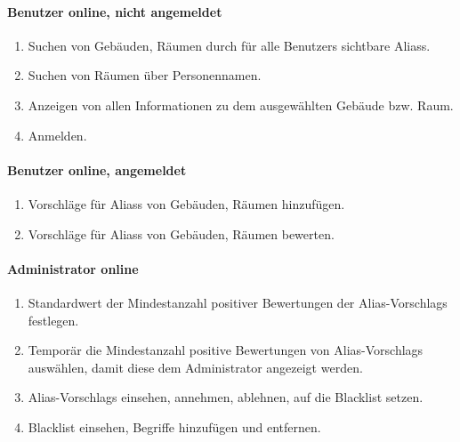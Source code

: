 \paragraph{\Gls{Benutzer} online, nicht angemeldet}
\begin{enumerate}[label=\textbf{/T\arabic*0/}, align=left, resume]
	\item Suchen von Gebäuden, Räumen durch für alle \Glspl{Benutzer} sichtbare \Glspl{Alias}.
	\item Suchen von Räumen über Personennamen.
	\item Anzeigen von allen Informationen zu dem ausgewählten Gebäude bzw. Raum.
	\item Anmelden.
\end{enumerate}

\paragraph{\Gls{Benutzer} online, angemeldet}
\begin{enumerate}[label=\textbf{/T\arabic*0/}, align=left, resume]
	\item Vorschläge für \Glspl{Alias} von Gebäuden, Räumen hinzufügen.
	\item Vorschläge für \Glspl{Alias} von Gebäuden, Räumen bewerten.
\end{enumerate}

\paragraph{\Gls{Administrator} online}
\begin{enumerate}[label=\textbf{/T\arabic*0/}, align=left, resume]
	\item Standardwert der Mindestanzahl positiver Bewertungen der \Glspl{Alias-Vorschlag} festlegen.
	\item Temporär die Mindestanzahl positive Bewertungen von \Glspl{Alias-Vorschlag} auswählen, damit diese dem \Gls{Administrator} angezeigt werden.
	\item \Glspl{Alias-Vorschlag} einsehen, annehmen, ablehnen, auf die \Gls{Blacklist} setzen.
	\item \Gls{Blacklist} einsehen, Begriffe hinzufügen und entfernen.
\end{enumerate}
